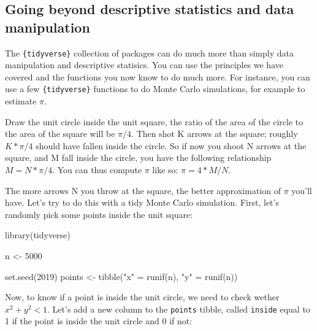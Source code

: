 \documentclass[
]{article}
\newenvironment{Shaded}{\begin{snugshade}}{\end{snugshade}}
\newcommand{\DecValTok}[1]{\textcolor[rgb]{0.00,0.00,0.81}{#1}}
\newcommand{\FunctionTok}[1]{\textcolor[rgb]{0.00,0.00,0.00}{#1}}
\newcommand{\NormalTok}[1]{#1}
\newcommand{\OtherTok}[1]{\textcolor[rgb]{0.56,0.35,0.01}{#1}}
\newcommand{\StringTok}[1]{\textcolor[rgb]{0.31,0.60,0.02}{#1}}
\begin{document}
\hypertarget{going-beyond-descriptive-statistics-and-data-manipulation}{%
\subsection{Going beyond descriptive statistics and data manipulation}\label{going-beyond-descriptive-statistics-and-data-manipulation}}

The \texttt{\{tidyverse\}} collection of packages can do much more than simply data manipulation and
descriptive statisics. You can use the principles we have covered and the functions you now know
to do much more. For instance, you can use a few \texttt{\{tidyverse\}} functions to do Monte Carlo simulations,
for example to estimate \(\pi\).

Draw the unit circle inside the unit square, the ratio of the area of the circle to the area of the
square will be \(\pi/4\). Then shot K arrows at the square; roughly \(K*\pi/4\) should have fallen
inside the circle. So if now you shoot N arrows at the square, and M fall inside the circle, you have
the following relationship \(M = N*\pi/4\). You can thus compute \(\pi\) like so: \(\pi = 4*M/N\).

The more arrows N you throw at the square, the better approximation of \(\pi\) you'll have. Let's
try to do this with a tidy Monte Carlo simulation. First, let's randomly pick some points inside
the unit square:

\begin{Shaded}
\begin{Highlighting}[]
\FunctionTok{library}\NormalTok{(tidyverse)}

\NormalTok{n }\OtherTok{\textless{}{-}} \DecValTok{5000}

\FunctionTok{set.seed}\NormalTok{(}\DecValTok{2019}\NormalTok{)}
\NormalTok{points }\OtherTok{\textless{}{-}} \FunctionTok{tibble}\NormalTok{(}\StringTok{"x"} \OtherTok{=} \FunctionTok{runif}\NormalTok{(n), }\StringTok{"y"} \OtherTok{=} \FunctionTok{runif}\NormalTok{(n))}
\end{Highlighting}
\end{Shaded}

Now, to know if a point is inside the unit circle, we need to check wether \(x^2 + y^2 < 1\). Let's
add a new column to the \texttt{points} tibble, called \texttt{inside} equal to 1 if the point is inside the
unit circle and 0 if not:
\end{document}
